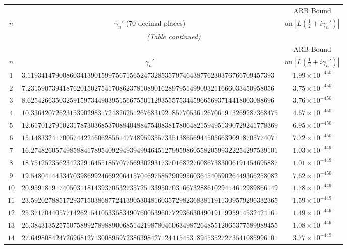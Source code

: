 \documentclass[12pt,reqno]{amsart}
\theoremstyle{remark}
\begin{document}
\begin{longtable}{clc}
\toprule
 & & ARB Bound \\
$n$ & \multicolumn{1}{c}{$\gamma_n'$ (70 decimal places)} & on $|L(\tfrac{1}{2}+i\gamma_n')|$ \\
\midrule
\endfirsthead
\multicolumn{3}{c}{\small\itshape (Table continued)} \\
\toprule
 & & ARB Bound \\
$n$ & \multicolumn{1}{c}{$\gamma_n'$} & on $|L(\tfrac{1}{2}+i\gamma_n')|$ \\
\midrule
\endhead
\bottomrule
\endlastfoot
$1$ & $3.1193414790086034139015997567156524732853579746438776230376766709457393$ & $1.99\times 10^{-450}$ \\
$2$ & $7.2315907394187620150275417086237810890162897951499093211666033450958056$ & $3.75\times 10^{-450}$ \\
$3$ & $8.6254266350325915973449039515667550112935557534459665693714418003088696$ & $3.76\times 10^{-450}$ \\
$4$ & $10.3364207262315390298317248262512676831921857705361267061913269287368475$ & $4.67\times 10^{-450}$ \\
$5$ & $12.6170127910231787303685370884048847540838178064821594951390729241778369$ & $6.95\times 10^{-450}$ \\
$6$ & $15.1483324170057442246062855147748959355733513865694450566390918705774071$ & $7.72\times 10^{-450}$ \\
$7$ & $16.2748260574985884178954092949394994645127995986055820599322254297539101$ & $1.03\times 10^{-449}$ \\
$8$ & $18.7512523562342329164551857077569302931737016822760867383006191454695887$ & $1.01\times 10^{-449}$ \\
$9$ & $19.5480414433470398699246692064157046975852909956036454059026449366258082$ & $7.62\times 10^{-450}$ \\
$10$ & $20.9591819174050311814393705327357251339507031667328861029414612989866149$ & $1.78\times 10^{-449}$ \\
$11$ & $23.5920278851729371503868772413905304816035729823683811911309579296332365$ & $1.59\times 10^{-449}$ \\
$12$ & $25.3717044057714262154105335834907600539607729366304901911995914532424161$ & $1.49\times 10^{-449}$ \\
$13$ & $26.3843135257507589927898890068514219878046063498726485512065377589989455$ & $1.08\times 10^{-449}$ \\
$14$ & $27.6498084247269681271300895972386398427124415453189453527273541085996101$ & $3.77\times 10^{-449}$ \\

\end{longtable}
\end{document}
